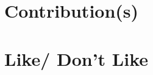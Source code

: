 \documentclass[12pt,portuguese,a4paper]{article}
\begin{document}

\section{Contribution(s)}



\section{Like/ Don't Like}




\end{document}
